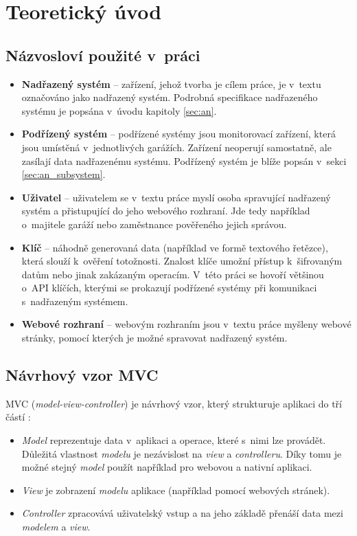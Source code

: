 \chapter{Teoretický úvod}
\label{sec:th}


\section{Názvosloví použité v~práci}

\begin{itemize}
    \item \textbf{Nadřazený systém} -- zařízení, jehož tvorba je cílem práce, je v~textu označováno jako nadřazený systém. Podrobná specifikace nadřazeného systému je popsána v~úvodu kapitoly \ref{sec:an}.
    \item \textbf{Podřízený systém} -- podřízené systémy jsou monitorovací zařízení, která jsou umístěná v~jednotlivých garážích. Zařízení neoperují samostatně, ale zasílají data nadřazenému systému. Podřízený systém je blíže popsán v~sekci \ref{sec:an_subsystem}.
    \item \textbf{Uživatel} -- uživatelem se v~textu práce myslí osoba spravující nadřazený systém a přistupující do jeho webového rozhraní. Jde tedy například o~majitele garáží nebo zaměstnance pověřeného jejich správou.
    \item \textbf{Klíč} -- náhodně generovaná data (například ve formě textového řetězce), která slouží k~ověření totožnosti. Znalost klíče umožní přístup k~šifrovaným datům nebo jinak zakázaným operacím. V~této práci se hovoří většinou o~API klíčích, kterými se prokazují podřízené systémy při komunikaci s~nadřazeným systémem.
    \item \textbf{Webové rozhraní} -- webovým rozhraním jsou v~textu práce myšleny webové stránky, pomocí kterých je možné spravovat nadřazený systém.
\end{itemize}

\section{Návrhový vzor MVC}

MVC (\textit{model-view-controller}) je návrhový vzor, který strukturuje aplikaci do tří částí \cite{mvc_dalling}:

\begin{itemize}
    \item \textit{Model} reprezentuje data v~aplikaci a operace, které s~nimi lze provádět. Důležitá vlastnost \textit{modelu} je nezávislost na \textit{view} a \textit{controlleru}. Díky tomu je možné stejný \textit{model} použít například pro webovou a nativní aplikaci.
    \item \textit{View} je zobrazení \textit{modelu} aplikace (například pomocí webových stránek).
    \item \textit{Controller} zpracovává uživatelský vstup a na jeho základě přenáší data mezi \textit{modelem} a \textit{view}.
\end{itemize}

